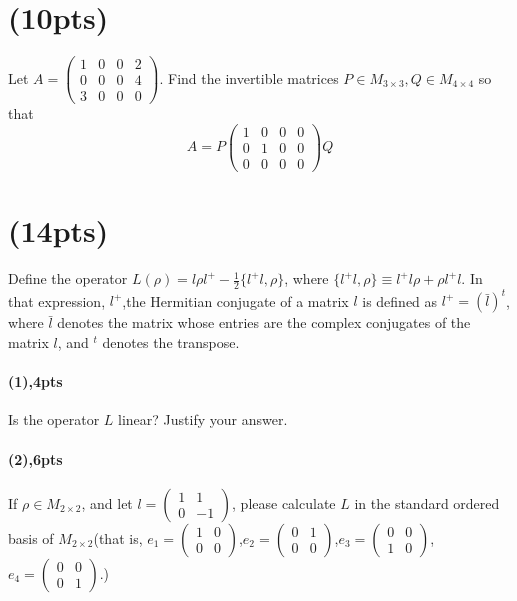 \documentclass{article}
\begin{document}
\section{(10pts)}Let $A=\begin{pmatrix}
    1&0&0&2\\0&0&0&4\\3&0&0&0
\end{pmatrix}$.
Find the invertible matrices $P\in M_{3\times 3},Q\in M_{4\times 4}$ so that $$A=P\begin{pmatrix}
    1&0&0&0\\0&1&0&0\\0&0&0&0
\end{pmatrix}Q$$
\section{(14pts)}
Define the operator $L(\rho)=l\rho l^+-\frac{1}{2}\{l^+ l,\rho\}$, where $\{l^+ l,\rho\}\equiv l^+ l\rho+\rho l^+ l$. In that expression, $l^+$,the Hermitian conjugate of a matrix $l$ is defined as $l^+=(\bar{l})^t$, where $\bar{l}$ denotes the matrix whose entries are the complex conjugates of the matrix $l$, and $^t$ denotes the transpose. 
\paragraph{(1),4pts}
Is the operator $L$ linear? Justify your answer.
\paragraph{(2),6pts}
If $\rho\in M_{2\times 2}$, and let $l=\begin{pmatrix}
    1&1\\0&-1
\end{pmatrix}$, please calculate $L$ in the standard ordered basis of $M_{2\times 2}$(that is, $e_1=\begin{pmatrix}
    1&0\\0&0
\end{pmatrix}$,$e_2=\begin{pmatrix}
    0&1\\0&0
\end{pmatrix}$,$e_3=\begin{pmatrix}
    0&0\\1&0
\end{pmatrix}$,$e_4=\begin{pmatrix}
    0&0\\0&1
\end{pmatrix}$.)
\end{document}
